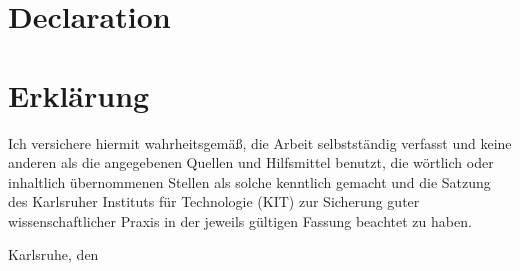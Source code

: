
{\chapter{Declaration}}
{\chapter{Erklärung}}
\label{ch:Declaration}

Ich versichere hiermit wahrheitsgemäß, die Arbeit selbstständig verfasst und keine anderen als die angegebenen Quellen und Hilfsmittel benutzt, die wörtlich oder inhaltlich übernommenen Stellen als solche kenntlich gemacht und die Satzung des Karlsruher Instituts für Technologie (KIT) zur Sicherung guter wissenschaftlicher Praxis in der jeweils gültigen Fassung beachtet zu haben.

\vspace*{1cm}
\hspace*{4cm} Karlsruhe, den \submissiontime \hspace*{0.5cm}\hrulefill \\
\hspace*{10.5cm} \myname \\

